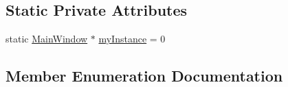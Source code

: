 \subsection*{Static Private Attributes}
\begin{DoxyCompactItemize}
\item 
static \hyperlink{classMainWindow}{Main\+Window} $\ast$ \hyperlink{classMainWindow_a40d454c031dd2ff6a4813fb298c79905}{my\+Instance} = 0
\end{DoxyCompactItemize}


\subsection{Member Enumeration Documentation}
